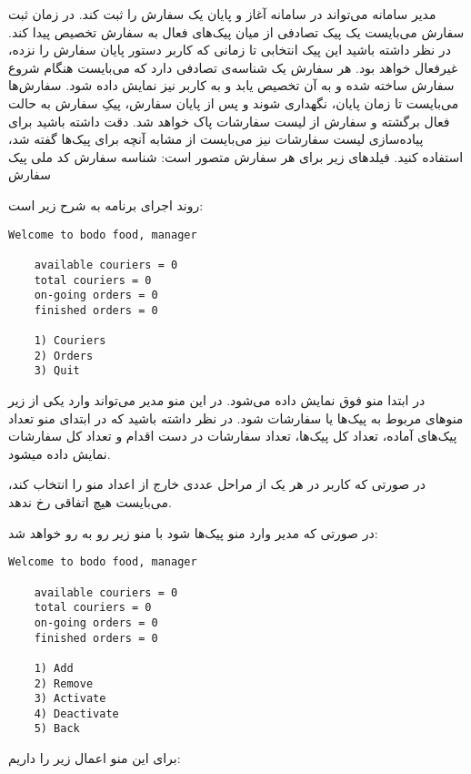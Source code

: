 \documentclass[../main.tex]{subfiles}
\begin{document}

مدیر سامانه می‌تواند در سامانه آغاز و پایان یک سفارش را ثبت کند. در زمان ثبت سفارش می‌بایست یک پیک تصادفی از میان پیک‌های فعال به سفارش تخصیص پیدا کند. در نظر داشته باشید این پیک انتخابی تا زمانی که کاربر دستور پایان سفارش را نزده، غیرفعال خواهد بود.
هر سفارش یک شناسه‌ی تصادفی دارد که می‌بایست هنگام شروع سفارش ساخته شده و به آن تخصیص یابد و به کاربر نیز نمایش داده شود. سفارش‌ها می‌بایست تا زمان پایان، نگهداری شوند و پس از پایان سفارش، پیکِ سفارش به حالت فعال برگشته و سفارش از لیست سفارشات پاک خواهد شد. دقت داشته باشید برای پیاده‌سازی لیست سفارشات نیز می‌بایست از مشابه آنچه برای پیک‌ها گفته شد، استفاده کنید.
فیلدهای زیر برای هر سفارش متصور است:
 شناسه سفارش
 کد ملی پیک سفارش


روند اجرای برنامه به شرح زیر است:

\begin{latin}
\begin{lstlisting}[]
    Welcome to bodo food, manager

    available couriers = 0
    total couriers = 0
    on-going orders = 0
    finished orders = 0

    1) Couriers
    2) Orders
    3) Quit
\end{lstlisting}
\end{latin}

در ابتدا منو فوق نمایش داده می‌شود. در این منو مدیر می‌تواند وارد یکی از زیر منوهای مربوط به پیک‌ها یا سفارشات شود.
در نظر داشته باشید که در ابتدای منو تعداد پیک‌های آماده، تعداد کل پیک‌ها، تعداد سفارشات در دست اقدام و تعداد کل سفارشات نمایش داده میشود.

در صورتی که کاربر در هر یک از مراحل عددی خارج از اعداد منو را انتخاب کند، می‌بایست هیچ اتفاقی رخ ندهد.

در صورتی که مدیر وارد منو پیک‌ها شود با منو زیر رو به رو خواهد شد:


\begin{latin}
\begin{lstlisting}[]
    Welcome to bodo food, manager

    available couriers = 0
    total couriers = 0
    on-going orders = 0
    finished orders = 0

    1) Add
    2) Remove
    3) Activate
    4) Deactivate
    5) Back
\end{lstlisting}
\end{latin}

برای این منو اعمال زیر را داریم:
\end{document}
